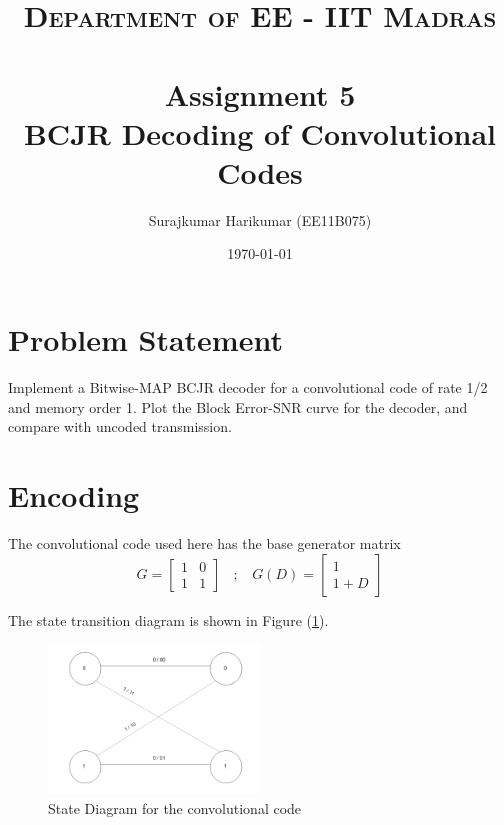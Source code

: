 \documentclass[paper=a4, fontsize=12pt]{scrartcl} %
\title{	
\normalfont \normalsize 
\textsc{Department of EE - IIT Madras} \\ [25pt] %
\horrule{0.5pt} \\[0.4cm] %
\huge Assignment 5 \\BCJR Decoding of Convolutional Codes %
\horrule{2pt} \\[0.5cm] %
}
\author{Surajkumar Harikumar (EE11B075)} %
\date{\normalsize\today} %
\numberwithin{equation}{section} %
\numberwithin{figure}{section} %
\numberwithin{table}{section} %
\begin{document}
\maketitle %


\section{Problem Statement}

Implement a Bitwise-MAP BCJR decoder for a convolutional code of rate 1/2 and memory order 1. Plot the Block Error-SNR curve for the decoder, and compare with uncoded transmission. 

\section{Encoding}

The convolutional code used here has the base generator matrix
\begin{equation}
G = \begin{bmatrix}
       1 & 0           \\[0.3em]
       1 & 1
     \end{bmatrix} \:\:\:\: ; \:\:\:\: 
     G(D) = \begin{bmatrix}
      1          \\[0.3em]
       1+D
     \end{bmatrix}
\end{equation}

The state transition diagram is shown in Figure (\ref{state}).


\begin{figure}
\centering
\includegraphics[width=0.5\textwidth]{images/state}
\caption{State Diagram for the convolutional code}
\label{state}
\end{figure}
\end{document}

